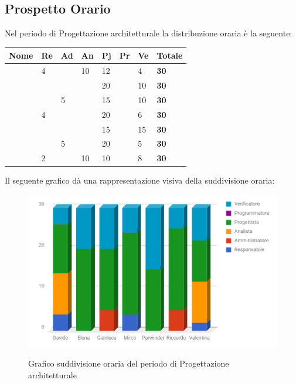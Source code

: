 \documentclass[PianoDiProgetto.tex]{subfiles}
\begin{document}
\subsection{Prospetto Orario}
Nel periodo di Progettazione architetturale la distribuzione oraria è la seguente:
\begin{center}
\begin{table}[htbp]
	\centering
	\renewcommand\arraystretch{1.5}
	\begin{tabularx}{\textwidth}{p{4cm}|p{1cm}|p{1cm}|p{1cm}|p{1cm}|p{1cm}|p{1cm}|p{2cm}}
		\hline
		\textbf{Nome} & \textbf{Re} & \textbf{Ad} & \textbf{An} & \textbf{Pj} & \textbf{Pr} & \textbf{Ve} & \textbf{Totale} \\
		\hline
		\Davide & 4 & \ & 10 & 12 & \ & 4 & \textbf{30} \\
		\hline
		\Elena & \ & \ & \ & 20 & \ & 10 & \textbf{30} \\
		\hline
		\Gianluca & \ & 5 & \ & 15 & \ & 10 & \textbf{30} \\
		\hline
		\Mirco & 4 & \ & \ & 20 & \ & 6 & \textbf{30} \\
		\hline
		\Parwinder & \ & \ & \ & 15 & \ & 15 & \textbf{30} \\
		\hline
		\Riccardo & \ & 5 & \ & 20 & \ & 5 & \textbf{30} \\
		\hline
		\Valentina & 2 & \ & 10 & 10 & \ & 8 & \textbf{30} \\
		\hline
	\end{tabularx}
\end{table}
\end{center}
Il seguente grafico dà una rappresentazione visiva della suddivisione oraria:
\begin{figure}[h]
	\includegraphics[width=12.5cm]{images/prospettoOrario/progArch.png}
	\label{fig:foo}
	\caption{Grafico suddivisione oraria del periodo di Progettazione architetturale}
\end{figure} 
\newpage
\end{document}

